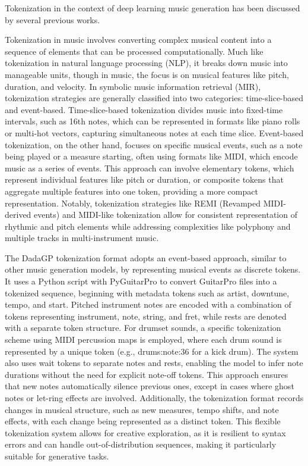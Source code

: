 \documentclass[11pt, a4paper]{article}
\begin{document}
Tokenization in the context of deep learning music generation has been discussed by several previous works.
\cite{agarwalStructureinformedPositionalEncoding2024, makrisConditionalDrumsGeneration2022, sarmentoDadaGPDatasetTokenized2021, hsiaoCompoundWordTransformer2021, cournutEncodagesTablaturesPour2020}

Tokenization in music involves converting complex musical content into a sequence of elements that can be processed computationally.
Much like tokenization in natural language processing (NLP), it breaks down music into manageable units, though in music, the focus is on musical features like pitch, duration, and velocity.
In symbolic music information retrieval (MIR), tokenization strategies are generally classified into two categories: time-slice-based and event-based. 
Time-slice-based tokenization divides music into fixed-time intervals, such as 16th notes, which can be represented in formats like piano rolls or multi-hot vectors, capturing simultaneous notes at each time slice.
Event-based tokenization, on the other hand, focuses on specific musical events, such as a note being played or a measure starting, often using formats like MIDI, which encode music as a series of events.
This approach can involve elementary tokens, which represent individual features like pitch or duration, or composite tokens that aggregate multiple features into one token, providing a more compact representation.
Notably, tokenization strategies like REMI (Revamped MIDI-derived events) and MIDI-like tokenization allow for consistent representation of rhythmic and pitch elements while addressing complexities like polyphony and multiple tracks in multi-instrument music\cite{leNaturalLanguageProcessing2024}.


The DadaGP tokenization format adopts an event-based approach, similar to other music generation models, by representing musical events as discrete tokens.
It uses a Python script with PyGuitarPro to convert GuitarPro files into a tokenized sequence, beginning with metadata tokens such as artist, downtune, tempo, and start.
Pitched instrument notes are encoded with a combination of tokens representing instrument, note, string, and fret, while rests are denoted with a separate token structure.
For drumset sounds, a specific tokenization scheme using MIDI percussion maps is employed, where each drum sound is represented by a unique token (e.g., drums:note:36 for a kick drum).
The system also uses wait tokens to separate notes and rests, enabling the model to infer note durations without the need for explicit note-off tokens.
This approach ensures that new notes automatically silence previous ones, except in cases where ghost notes or let-ring effects are involved.
Additionally, the tokenization format records changes in musical structure, such as new measures, tempo shifts, and note effects, with each change being represented as a distinct token.
This flexible tokenization system allows for creative exploration, as it is resilient to syntax errors and can handle out-of-distribution sequences, making it particularly suitable for generative tasks.
\end{document}
